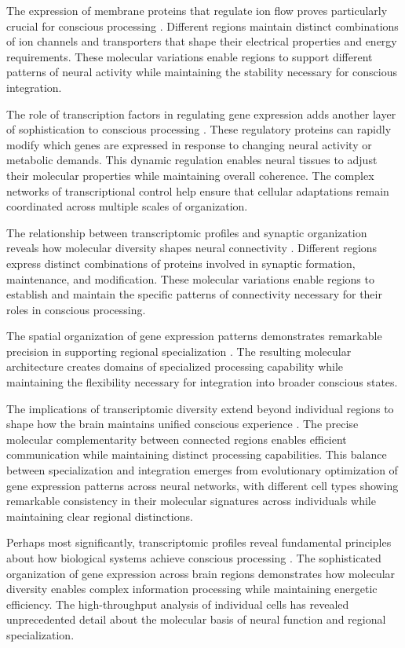 \begin{refsection}
The expression of membrane proteins that regulate ion flow proves particularly crucial for conscious processing \cite{Zeisel2018}. Different regions maintain distinct combinations of ion channels and transporters that shape their electrical properties and energy requirements. These molecular variations enable regions to support different patterns of neural activity while maintaining the stability necessary for conscious integration.

The role of transcription factors in regulating gene expression adds another layer of sophistication to conscious processing \cite{Nowakowski2017}. These regulatory proteins can rapidly modify which genes are expressed in response to changing neural activity or metabolic demands. This dynamic regulation enables neural tissues to adjust their molecular properties while maintaining overall coherence. The complex networks of transcriptional control help ensure that cellular adaptations remain coordinated across multiple scales of organization.

The relationship between transcriptomic profiles and synaptic organization reveals how molecular diversity shapes neural connectivity \cite{Angulo2022}. Different regions express distinct combinations of proteins involved in synaptic formation, maintenance, and modification. These molecular variations enable regions to establish and maintain the specific patterns of connectivity necessary for their roles in conscious processing.

The spatial organization of gene expression patterns demonstrates remarkable precision in supporting regional specialization \cite{Zeng2017}. The resulting molecular architecture creates domains of specialized processing capability while maintaining the flexibility necessary for integration into broader conscious states.

The implications of transcriptomic diversity extend beyond individual regions to shape how the brain maintains unified conscious experience \cite{Tasic2018}. The precise molecular complementarity between connected regions enables efficient communication while maintaining distinct processing capabilities. This balance between specialization and integration emerges from evolutionary optimization of gene expression patterns across neural networks, with different cell types showing remarkable consistency in their molecular signatures across individuals while maintaining clear regional distinctions.

Perhaps most significantly, transcriptomic profiles reveal fundamental principles about how biological systems achieve conscious processing \cite{Macosko2015}. The sophisticated organization of gene expression across brain regions demonstrates how molecular diversity enables complex information processing while maintaining energetic efficiency. The high-throughput analysis of individual cells has revealed unprecedented detail about the molecular basis of neural function and regional specialization.


\end{refsection}
